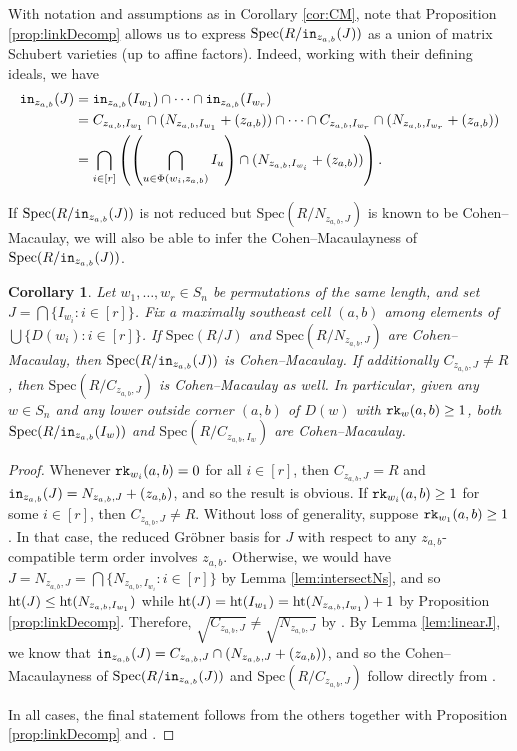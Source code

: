 \documentclass[12pt,reqno]{amsart}
\newtheorem{corollary}[theorem]{Corollary}
\newtheorem{Main Conjecture}[theorem]{Main Conjecture}
\theoremstyle{remark}
\theoremstyle{plain}
\newcommand{\init}{{\tt in}}
\newcommand{\hgt}{{\rm{ht }}}
\newcommand{\rk}{{\tt rk}}
\newcommand{\spec}{{\mbox{Spec}}}
\begin{document}
With notation and assumptions as in Corollary \ref{cor:CM}, note that Proposition \ref{prop:linkDecomp} allows us to express $\spec(R/\init_{z_{a,b}}(J))$ as a union of matrix Schubert varieties (up to affine factors).
Indeed, working with their defining ideals, we have \begin{align*}
\init_{z_{a,b}}(J) &= \init_{z_{a,b}}(I_{w_1}) \cap \cdots \cap \init_{z_{a,b}}(I_{w_r})\\
&= C_{z_{a,b},I_{w_1}} \cap (N_{z_{a,b},I_{w_1}}+(z_{a,b})) \cap \cdots \cap C_{z_{a,b},I_{w_r}} \cap (N_{z_{a,b},I_{w_r}}+(z_{a,b}))\\
&=\bigcap_{i \in [r]} \left(\left(\bigcap_{u \in \Phi(w_i,z_{a,b})}  I_{u} \right)\cap (N_{z_{a,b},I_{w_i}}+(z_{a,b})) \right).
\end{align*}  

If $\spec(R/\init_{z_{a,b}}(J))$ is not reduced but $\spec(R/N_{z_{a,b},J})$ is known to be Cohen--Macaulay, we will also be able to infer the Cohen--Macaulayness of $\spec(R/\init_{z_{a,b}}(J))$.  

\begin{corollary}\label{cor:nonRadicalCM}
Let $w_1, \ldots, w_r \in S_n$ be permutations of the same  length, and set  
$J= \bigcap \{I_{w_i}:i\in[r]\}$.
Fix a maximally southeast cell $(a,b)$ among elements of 
$\bigcup \{D(w_i):i\in[r]\}$.
If $\spec(R/J)$ and $\spec(R/N_{z_{a,b},J})$ are Cohen--Macaulay, then $\spec(R/\init_{z_{a,b}}(J))$ is Cohen--Macaulay.  If additionally $C_{z_{a,b},J} \neq R$, then $\spec(R/C_{z_{a,b},J})$ is Cohen--Macaulay as well.  In particular, given any $w \in S_n$ and any lower outside corner $(a,b)$ of $D(w)$ with $\rk_w(a,b) \geq 1$,  both $\spec(R/\init_{z_{a,b}}(I_w))$ and $\spec(R/C_{z_{a,b},I_w})$ are Cohen--Macaulay.
\end{corollary}
\begin{proof}
Whenever $\rk_{w_i}(a,b) = 0$ for all $i \in [r]$, then $C_{z_{a,b},J} = R$ and $\init_{z_{a,b}}(J) = N_{z_{a,b},J}+(z_{a,b})$, and so the result is obvious.  If $\rk_{w_i}(a,b) \geq 1$ for some $i \in [r]$, then $C_{z_{a,b},J} \neq R$.  Without loss of generality, suppose $\rk_{w_1}(a,b)\geq 1$.  In that case, the reduced Gr\"obner basis for $J$ with respect to any $z_{a,b}$-compatible term order involves $z_{a,b}$.  Otherwise, we would have 
$J = N_{z_{a,b},J} =  \bigcap\{ N_{z_{a,b},I_{w_i}}:i \in [r]\}$
by Lemma \ref{lem:intersectNs}, and so $\hgt (J) \leq \hgt (N_{z_{a,b},I_{w_1}})$ while $\hgt (J) = \hgt (I_{w_1}) = \hgt (N_{z_{a,b},I_{w_1}})+1$ by Proposition \ref{prop:linkDecomp}.  Therefore, $\sqrt{C_{z_{a,b},J}} \neq \sqrt{N_{z_{a,b},J}}$ by \cite[Proposition 2.4]{KR}.  By Lemma \ref{lem:linearJ}, we know that $\init_{z_{a,b}}(J) = C_{z_{a,b},J} \cap (N_{z_{a,b},J}+(z_{a,b}))$, and so the Cohen--Macaulayness of $\spec(R/\init_{z_{a,b}}(J))$ and $\spec(R/C_{z_{a,b},J})$ follow directly from \cite[Corollary 4.11]{KR}.  

In all cases, the final statement follows from the others together with Proposition \ref{prop:linkDecomp} and \cite[Proposition~3.3(d)]{Ful92}.
\end{proof}
\end{document}
